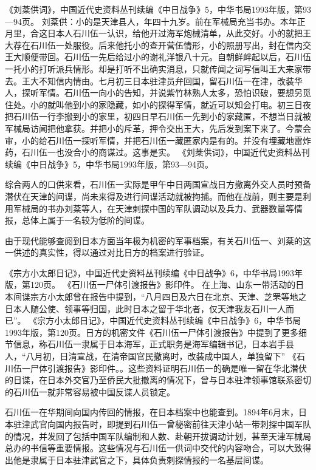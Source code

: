 \documentclass[12pt,UTF8]{ctexbook}
\begin{document}
《刘棻供词》，中国近代史资料丛刊续编《中日战争》5，中华书局1993年版，第93—94页。
刘棻供：小的是天津县人，年四十九岁。前在军械局充当书办。本年正月里，合这日本人石川伍一认识，给他开过海军炮械清单，从此交好。小的就把王大荐在石川伍一处服役。后来他托小的查开营伍情形，小的照册写出，封在信内交王大顺便带回。石川伍一先后给过小的谢礼洋银八十元。自朝鲜衅起以后，石川伍一托小的打听派兵情形。却是打听不出确实消息，只就传闻之词写信叫王大来家带去。王大不知信内情由。七月初三日本驻津员弁回国，留石川伍一在津，改装华人，探听军情。石川伍一向小的告知，并说紫竹林熟人太多，恐怕识破，要想另觅住处。小的就叫他到小的家隐藏，如小的探得军情，就近可以知会打电。初三日夜把石川伍一行李搬到小的家里，初四日早石川伍一先到小的家藏匿，不想当日就被军械局访闻把他拿获。并把小的斥革，押令交出王大，先后发到案下来了。今蒙会审，小的给石川伍一探听军情，并把石川伍一藏匿家内是有的。并没有埋藏地雷炸药，石川伍一也没合小的商谋过。这事是实。 《刘棻供词》，中国近代史资料丛刊续编《中日战争》5，中华书局1993年版，第93—94页。

综合两人的口供来看，石川伍一实际是甲午中日两国宣战日方撤离外交人员时预备潜伏在天津的间谍，尚未来得及进行间谍活动就被拘捕。而他在战前，则主要是利用军械局的书办刘棻等人，在天津刺探中国的军队调动以及兵力、武器数量等情报，总体上属于一名较为低阶的间谍。

由于现代能够查阅到日本方面当年极为机密的军事档案，有关石川伍一、刘棻的这一供述的真实性，得以通过对比日方的档案进行验证。

《宗方小太郎日记》，中国近代史资料丛刊续编《中日战争》6，中华书局1993年版，第120页。
《石川伍一尸体引渡报告》影印件。
在上海、山东一带活动的日本间谍宗方小太郎曾在报告中提到，“八月四日及六日在北京、天津、芝罘等地之日本人随公使、领事等归国，此时日本之留于华北者，仅天津我友石川一人而已”。 《宗方小太郎日记》，中国近代史资料丛刊续编《中日战争》6，中华书局1993年版，第120页。日方的机密文件《石川伍一尸体引渡报告》中提到了更多细节信息，称石川伍一隶属于日本海军，正式职务是海军编辑书记，日本岩手县人，“八月初，日清宣战，在清帝国官民撤离时，改装成中国人，单独留下” 《石川伍一尸体引渡报告》影印件。。这些资料证明石川伍一的确是唯一留在华北潜伏的日谍，在日本外交官乃至侨民大批撤离的情况下，曾与日本驻津领事馆联系密切的石川伍一就非常容易被中国反谍人员锁定。

石川伍一在华期间向国内传回的情报，在日本档案中也能查到。1894年6月末，日本驻津武官向国内报告时，即提到石川伍一曾秘密前往天津小站一带刺探中国军队的情况，并发回了包括中国军队编制和人数、赴朝开拔调动计划，甚至天津军械局总办的书信等重要情报。这些情况与石川伍一供词中交代的内容吻合，可以大致得出他是隶属于日本驻津武官之下，具体负责刺探情报的一名基层间谍。
\end{document}
